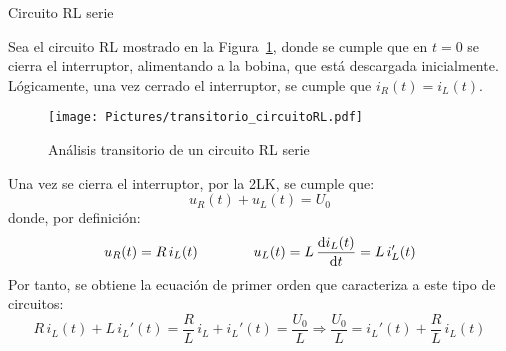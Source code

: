 \documentclass[11pt]{book} %
\makeatletter
\numberwithin{dummy}{section}
\theoremstyle{ocrenumbox}
\theoremstyle{blacknumex}
\theoremstyle{blacknumbox}
\theoremstyle{ocrenum}
\renewcommand{\subsection}{\@startsection {subsection}{2}{\z@}
{-3ex \@plus -0.1ex \@minus -.4ex}
{0.5ex \@plus.2ex }
{\normalfont\sffamily\bfseries}}
\makeatother
\begin{document}
	\subsection{Circuito RL serie}
	
	Sea el circuito RL mostrado en la Figura~\ref{fig.transitorio_RL}, donde se cumple que en $t = 0$ se cierra el interruptor, alimentando a la bobina, que está descargada inicialmente. Lógicamente, una vez cerrado el interruptor, se cumple que $i_R(t)=i_L(t)$.  
	\begin{figure}[htbp]
	    \centering
	    \texttt{[image: Pictures/transitorio\_circuitoRL.pdf]}
	    \caption{Análisis transitorio de un circuito RL serie}
	    \label{fig.transitorio_RL}
	\end{figure}
	
    Una vez se cierra el interruptor, por la 2LK, se cumple que:
	\begin{equation*}
	    u_R(t) + u_L(t) = U_0
	\end{equation*}
	donde, por definición: 
	\begin{equation*}
	    u_R(t)=R\,i_L(t)\qquad\qquad u_L(t)=L\,\diff{i_L(t)}{t}=L\,i_L'(t)
	\end{equation*}
	Por tanto, se obtiene la ecuación de primer orden que caracteriza a este tipo de circuitos:
	\begin{equation}\label{eq.1orden_L}
	    R\,i_L(t)+L\, i_L'(t)=\dfrac{R}{L}\,i_L+i_L'(t)=\dfrac{U_0}{L}\Rightarrow \boxed{\dfrac{U_0}{L}=i_L'(t)+\dfrac{R}{L}\,i_L(t)}
	\end{equation}
	
\end{document}
